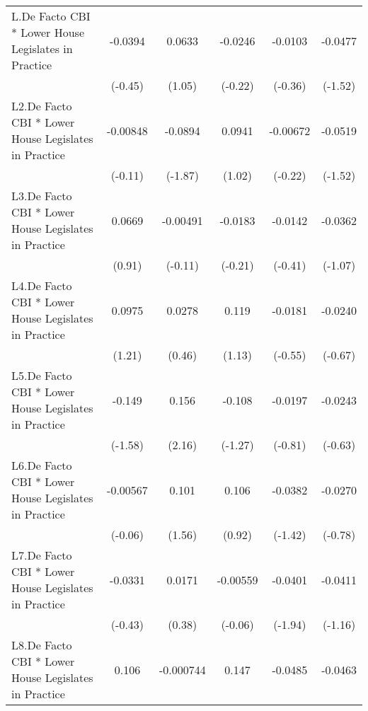 {\begin{longtable}{l*{5}{c}}
\addlinespace
L.De Facto CBI * Lower House Legislates in Practice&  -0.0394         &   0.0633         &  -0.0246         &  -0.0103         &  -0.0477         \\
                &  (-0.45)         &   (1.05)         &  (-0.22)         &  (-0.36)         &  (-1.52)         \\
\addlinespace
L2.De Facto CBI * Lower House Legislates in Practice& -0.00848         &  -0.0894         &   0.0941         & -0.00672         &  -0.0519         \\
                &  (-0.11)         &  (-1.87)         &   (1.02)         &  (-0.22)         &  (-1.52)         \\
\addlinespace
L3.De Facto CBI * Lower House Legislates in Practice&   0.0669         & -0.00491         &  -0.0183         &  -0.0142         &  -0.0362         \\
                &   (0.91)         &  (-0.11)         &  (-0.21)         &  (-0.41)         &  (-1.07)         \\
\addlinespace
L4.De Facto CBI * Lower House Legislates in Practice&   0.0975         &   0.0278         &    0.119         &  -0.0181         &  -0.0240         \\
                &   (1.21)         &   (0.46)         &   (1.13)         &  (-0.55)         &  (-0.67)         \\
\addlinespace
L5.De Facto CBI * Lower House Legislates in Practice&   -0.149         &    0.156\sym{*}  &   -0.108         &  -0.0197         &  -0.0243         \\
                &  (-1.58)         &   (2.16)         &  (-1.27)         &  (-0.81)         &  (-0.63)         \\
\addlinespace
L6.De Facto CBI * Lower House Legislates in Practice& -0.00567         &    0.101         &    0.106         &  -0.0382         &  -0.0270         \\
                &  (-0.06)         &   (1.56)         &   (0.92)         &  (-1.42)         &  (-0.78)         \\
\addlinespace
L7.De Facto CBI * Lower House Legislates in Practice&  -0.0331         &   0.0171         & -0.00559         &  -0.0401         &  -0.0411         \\
                &  (-0.43)         &   (0.38)         &  (-0.06)         &  (-1.94)         &  (-1.16)         \\
\addlinespace
L8.De Facto CBI * Lower House Legislates in Practice&    0.106         &-0.000744         &    0.147         &  -0.0485         &  -0.0463         \\

\end{longtable}}
